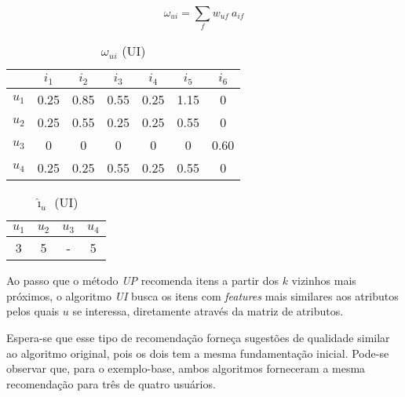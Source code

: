 \begin{equation}
\label{eq:wui} 
    \omega_{ui} = \sum_{f}{w_{uf}~a_{if}}
\end{equation} 


\begin{table}[p]
\begin{center}
    \caption{$\omega_{ui}$ (UI)}
    \label{tab:omega_ui_ui}
    \begin{tabular}{ | c | c | c | c | c | c | c | } 
    \hline
     & $i_1$ & $i_2$ & $i_3$ & $i_4$ & $i_5$ & $i_6$ \\ \hline
     $u_1$ & 0.25 & 0.85 & 0.55 & 0.25 & 1.15 & 0 \\ \hline
     $u_2$ & 0.25 & 0.55 & 0.25 & 0.25 & 0.55 & 0 \\ \hline
     $u_3$ & 0    & 0    & 0    & 0    & 0    & 0.60 \\ \hline
     $u_4$ & 0.25 & 0.25 & 0.55 & 0.25 & 0.55 & 0 \\ \hline
    \end{tabular}
\end{center}
\end{table}


\begin{table}[p]
\begin{center}
    \caption{$\hat{\imath}_u$ (UI)}
    \label{tab:i_u_ui}
    \begin{tabular}{ | c | c | c | c | } 
    \hline
     $u_1$ & $u_2$ & $u_3$ & $u_4$   \\ \hline
     3 & 5 & - & 5  \\ \hline
    \end{tabular}
\end{center}
\end{table}

Ao passo que o método \textit{UP} recomenda itens a partir dos $k$ vizinhos mais próximos, o algoritmo \textit{UI} busca os itens com \textit{features} mais similares aos atributos pelos quais $u$ se interessa, diretamente através da matriz de atributos. 

Espera-se que esse tipo de recomendação forneça sugestões de qualidade similar ao algoritmo original, pois os dois tem a mesma fundamentação inicial. Pode-se observar que, para o exemplo-base, ambos algoritmos forneceram a mesma recomendação para três de quatro usuários.


